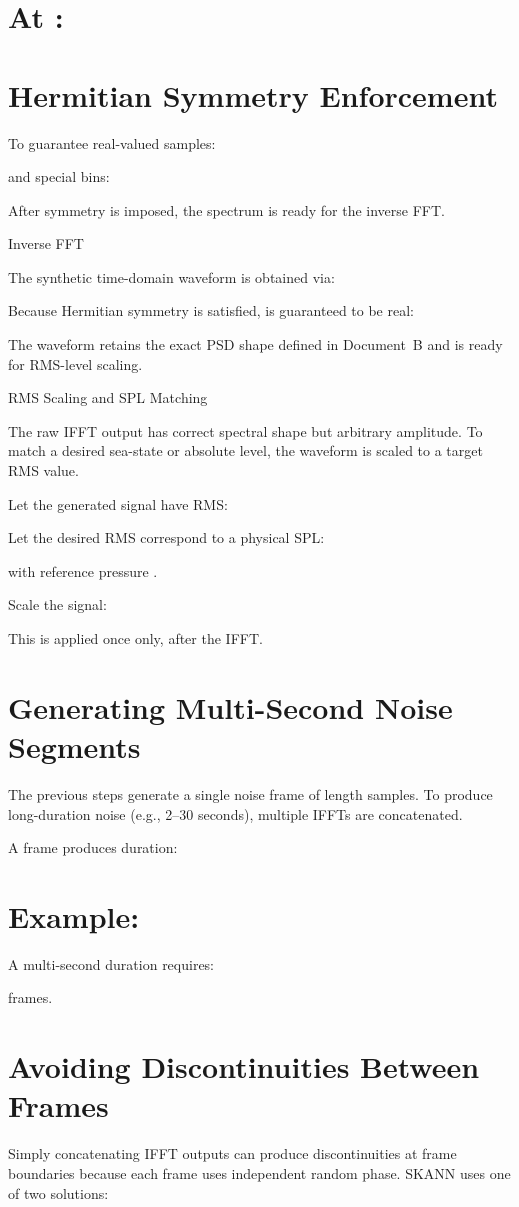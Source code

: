 \documentclass[12pt]{article}
\begin{document}
\section*{At :}

\section*{Hermitian Symmetry Enforcement}
To guarantee real-valued samples:


and special bins:


After symmetry is imposed, the spectrum is ready for the inverse FFT.

Inverse FFT

The synthetic time-domain waveform is obtained via:


Because Hermitian symmetry is satisfied,  is guaranteed to be real:


The waveform retains the exact PSD shape defined in Document B and is ready for RMS-level scaling.

RMS Scaling and SPL Matching

The raw IFFT output has correct spectral shape but arbitrary amplitude. To match a desired sea-state or absolute level, the waveform is scaled to a target RMS value.

Let the generated signal have RMS:


Let the desired RMS correspond to a physical SPL:


with reference pressure .

Scale the signal:


This is applied once only, after the IFFT.

\section*{Generating Multi-Second Noise Segments}
The previous steps generate a single noise frame of length  samples. To produce long-duration noise (e.g., 2–30 seconds), multiple IFFTs are concatenated.

A frame produces duration:


\section*{Example:}

A multi-second duration  requires:


frames.

\section*{Avoiding Discontinuities Between Frames}
Simply concatenating IFFT outputs can produce discontinuities at frame boundaries because each frame uses independent random phase. SKANN uses one of two solutions:
\end{document}

